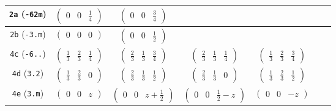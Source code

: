 \documentclass[fleqn,9pt,landscape]{jsarticle}
\begin{document}
\begin{center}
\begin{longtable}{ccccccc}
{\tt 2a} ({\tt -62m}) & $ \begin{pmatrix} 0 & 0 & \frac{1}{4} \end{pmatrix} $ & $ \begin{pmatrix} 0 & 0 & \frac{3}{4} \end{pmatrix} $ & $  $ & $  $ & $  $ & $  $ \\ \hline
{\tt 2b} ({\tt -3.m}) & $ \begin{pmatrix} 0 & 0 & 0 \end{pmatrix} $ & $ \begin{pmatrix} 0 & 0 & \frac{1}{2} \end{pmatrix} $ & $  $ & $  $ & $  $ & $  $ \\ \hline
{\tt 4c} ({\tt -6..}) & $ \begin{pmatrix} \frac{1}{3} & \frac{2}{3} & \frac{1}{4} \end{pmatrix} $ & $ \begin{pmatrix} \frac{2}{3} & \frac{1}{3} & \frac{3}{4} \end{pmatrix} $ & $ \begin{pmatrix} \frac{2}{3} & \frac{1}{3} & \frac{1}{4} \end{pmatrix} $ & $ \begin{pmatrix} \frac{1}{3} & \frac{2}{3} & \frac{3}{4} \end{pmatrix} $ & $  $ & $  $ \\ \hline
{\tt 4d} ({\tt 3.2}) & $ \begin{pmatrix} \frac{1}{3} & \frac{2}{3} & 0 \end{pmatrix} $ & $ \begin{pmatrix} \frac{2}{3} & \frac{1}{3} & \frac{1}{2} \end{pmatrix} $ & $ \begin{pmatrix} \frac{2}{3} & \frac{1}{3} & 0 \end{pmatrix} $ & $ \begin{pmatrix} \frac{1}{3} & \frac{2}{3} & \frac{1}{2} \end{pmatrix} $ & $  $ & $  $ \\ \hline
{\tt 4e} ({\tt 3.m}) & $ \begin{pmatrix} 0 & 0 & z \end{pmatrix} $ & $ \begin{pmatrix} 0 & 0 & z + \frac{1}{2} \end{pmatrix} $ & $ \begin{pmatrix} 0 & 0 & \frac{1}{2} - z \end{pmatrix} $ & $ \begin{pmatrix} 0 & 0 & - z \end{pmatrix} $ & $  $ & $  $ \\ \hline

\end{longtable}
\end{center}
\end{document}
